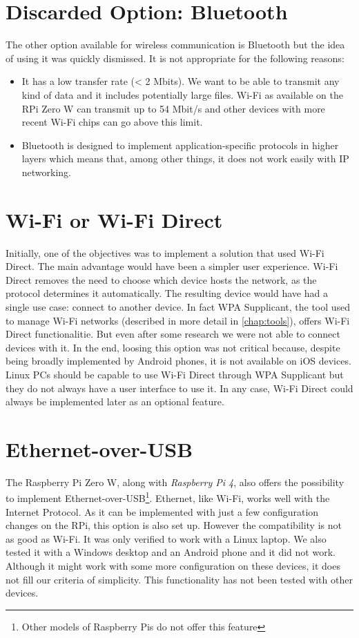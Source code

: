 \documentclass[a4paper,11pt,oneside]{report}
\begin{document}
\section{Discarded Option: Bluetooth}

The other option available for wireless communication is Bluetooth but the idea of using it was quickly dismissed. It is not appropriate for the following reasons:

\begin{itemize}
  \item It has a low transfer rate (< 2 Mbits). We want to be able to transmit any kind of data and it includes potentially large files. Wi-Fi as available on the RPi Zero W can transmit up to 54 Mbit/s and other devices with more recent Wi-Fi chips can go above this limit.
  \item Bluetooth is designed to implement application-specific protocols in higher layers which means that, among other things, it does not work easily with IP networking.
\end{itemize}

\section{Wi-Fi or Wi-Fi Direct}

Initially, one of the objectives was to implement a solution that used Wi-Fi Direct. The main advantage would have been a simpler user experience. Wi-Fi Direct removes the need to choose which device hosts the network, as the protocol determines it automatically. The resulting device would have had a single use case: connect to another device. In fact WPA Supplicant, the tool used to manage Wi-Fi networks (described in more detail in \autoref{chap:tools}), offers Wi-Fi Direct functionalitie. But even after some research we were not able to connect devices with it. In the end, loosing this option was not critical because, despite being broadly implemented by Android phones, it is not available on iOS devices. Linux PCs should be capable to use Wi-Fi Direct through WPA Supplicant but they do not always have a user interface to use it. In any case, Wi-Fi Direct could always be implemented later as an optional feature.

\section{Ethernet-over-USB}

The Raspberry Pi Zero W, along with \emph{Raspberry Pi 4}, also offers the possibility to implement Ethernet-over-USB\footnote{Other models of Raspberry Pis do not offer this feature}. Ethernet, like Wi-Fi, works well with the Internet Protocol. As it can be implemented with just a few configuration changes on the RPi, this option is also set up. However the compatibility is not as good as Wi-Fi. It was only verified to work with a Linux laptop. We also tested it with a Windows desktop and an Android phone and it did not work. Although it might work with some more configuration on these devices, it does not fill our criteria of simplicity. This functionality has not been tested with other devices.
\end{document}
